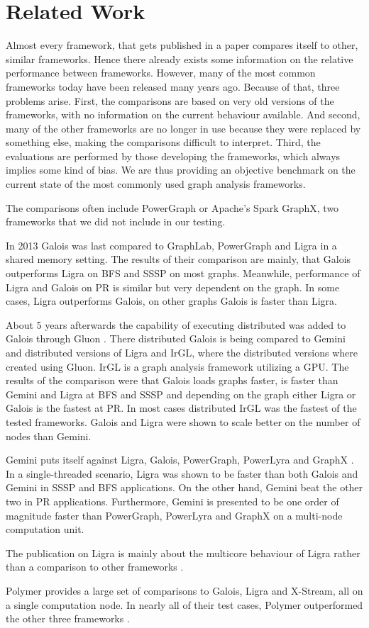 

\section{Related Work}

Almost every framework, that gets published in a paper compares itself to other, similar frameworks. 
Hence there already exists some information on the relative performance between frameworks. 
However, many of the most common frameworks today have been released many years ago. 
Because of that, three problems arise.
First, the comparisons are based on very old versions of the frameworks, with no information on the current behaviour available. 
And second, many of the other frameworks are no longer in use because they were replaced by something else, making the comparisons difficult to interpret.
Third, the evaluations are performed by those developing the frameworks, which always implies some kind of bias.
We are thus providing an objective benchmark on the current state of the most commonly used graph analysis frameworks. 

The comparisons often include PowerGraph or Apache's Spark GraphX, two frameworks that we did not include in our testing.

In 2013 \cite{Galois} Galois was last compared to GraphLab, PowerGraph and Ligra in a shared memory setting. The results of their comparison are mainly, that Galois outperforms Ligra on BFS and SSSP on most graphs. Meanwhile, performance of Ligra and Galois on PR is similar but very dependent on the graph. In some cases, Ligra outperforms Galois, on other graphs Galois is faster than Ligra.

About 5 years afterwards the capability of executing distributed was added to Galois through Gluon \cite{vertGalois}. 
There distributed Galois is being compared to Gemini and distributed versions of Ligra and IrGL, where the distributed versions where created using Gluon. 
IrGL is a graph analysis framework utilizing a GPU. 
The results of the comparison were that Galois loads graphs faster, is faster than Gemini and Ligra at BFS and SSSP and depending on the graph either Ligra or Galois is the fastest at PR. 
In most cases distributed IrGL was the fastest of the tested frameworks. 
Galois and Ligra were shown to scale better on the number of nodes than Gemini.

Gemini puts itself against Ligra, Galois, PowerGraph, PowerLyra and GraphX \cite{Gemini}.
In a single-threaded scenario, Ligra was shown to be faster than both Galois and Gemini in SSSP and BFS applications. 
On the other hand, Gemini beat the other two in PR applications.
Furthermore, Gemini is presented to be one order of magnitude faster than PowerGraph, PowerLyra and GraphX on a multi-node computation unit.

The publication on Ligra is mainly about the multicore behaviour of Ligra rather than a comparison to other frameworks \cite{Ligra}.

Polymer provides a large set of comparisons to Galois, Ligra and X-Stream, all on a single computation node. In nearly all of their test cases, Polymer outperformed the other three frameworks \cite{Polymer}. 


